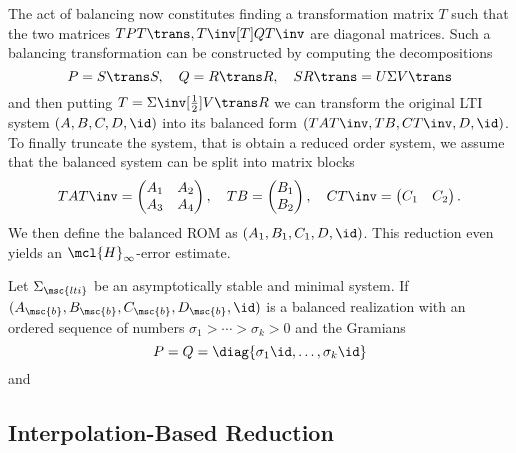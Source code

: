 The act of balancing now constitutes finding a transformation matrix $T$ such that the two matrices $T P T\trans, T\inv[T] Q T\inv$ are diagonal matrices.
Such a balancing transformation can be constructed by computing the decompositions
\begin{equation}\label{eq:balancing}
    P = S\trans S,\quad Q = R\trans R,\quad S R\trans = U \Sigma V\trans
\end{equation}
and then putting $T = \Sigma\inv[\frac{1}{2}] V\trans R$ we can transform the original LTI system $(A, B, C, D, \id)$ into its balanced form $(T A T\inv, T B, C T\inv, D, \id)$.
To finally truncate the system, that is obtain a reduced order system, we assume that the balanced system can be split into matrix blocks
\begin{equation*}
    T A T\inv = \begin{pmatrix}
        A_1 & A_2 \\
        A_3 & A_4
    \end{pmatrix},\quad T B = \begin{pmatrix}
        B_1 \\
        B_2
    \end{pmatrix},\quad C T\inv = \begin{pmatrix}
        C_1 & C_2
    \end{pmatrix}.
\end{equation*}
We then define the balanced ROM as $(A_1, B_1, C_1, D, \id)$.
This reduction even yields an $\mcl{H}_\infty$-error estimate.

\begin{theorem}[{Cf.~\cite[Theorem~6.4]{BB2017}}]\label{thm:h-inf-error}
    Let $\Sigma_{\msc{lti}}$ be an asymptotically stable and minimal system.
    If $(A_{\msc{b}}, B_{\msc{b}}, C_{\msc{b}}, D_{\msc{b}}, \id)$ is a balanced realization with an ordered sequence of numbers $\sigma_1 > \cdots > \sigma_k > 0$ and the Gramians
    \begin{equation*}
        P = Q = \diag{\sigma_1 \id, \dots, \sigma_k \id}
    \end{equation*}
    and
\end{theorem}

\subsection{Interpolation-Based Reduction}\label{subsec:interpolation-reduction}

